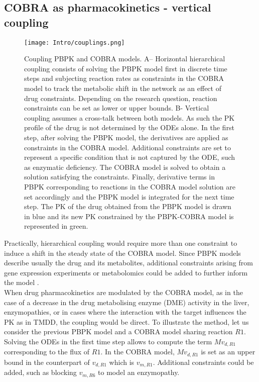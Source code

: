 \subsection{COBRA as pharmacokinetics - vertical coupling}
\begin{figure}[!htp]
\centering
	\texttt{[image: Intro/couplings.png]}%
	\caption[Coupling PBPK and COBRA models.]{Coupling PBPK and COBRA models. A– Horizontal hierarchical coupling consists of solving the PBPK model first in discrete time steps and subjecting reaction rates as constraints in the COBRA model to track the metabolic shift in the network as an effect of drug constraints. Depending on the research question, reaction constraints can be set as lower or upper bounds. B- Vertical coupling assumes a cross-talk between both models. As such the PK profile of the drug is not determined by the ODEs alone. In the first step, after solving the PBPK model, the derivatives are applied as constraints in the COBRA model. Additional constraints are set to represent a specific condition that is not captured by the ODE, such as enzymatic deficiency. The COBRA model is solved to obtain a solution satisfying the constraints. Finally, derivative terms in PBPK corresponding to reactions in the COBRA model solution are set accordingly and the PBPK model is integrated for the next time step. The PK of the drug obtained from the PBPK model is drawn in blue and its new PK constrained by the PBPK-COBRA model is represented in green.}
	\label{fig:couplings}
\end{figure}
Practically, hierarchical coupling would require more than one constraint to induce a shift in the steady state of the COBRA model. Since PBPK models describe usually the drug and its metabolites, additional constraints arising from gene expression experiments or metabolomics could be added to further inform the model \cite{willemsen2015metdfba}.\\
When drug pharmacokinetics are modulated by the COBRA model, as in the case of a decrease in the drug metabolising enzyme (DME) activity in the liver, enzymopathies, or in cases where the interaction with the target influences the PK as in TMDD, the coupling would be direct.
To illustrate the method, let us consider the previous PBPK model and a COBRA model sharing reaction $R1$. Solving the ODEs in the first time step allows to compute the term $Mv_{d,R1}$ corresponding to the flux of $R1$. In the COBRA model, $Mv_{d,R1}$ is set as an upper bound in the counterpart of $v_{d,R1}$ which is $v_{m,R1}$. Additional constraints could be added, such as blocking $v_{m,R6}$ to model an enzymopathy.
